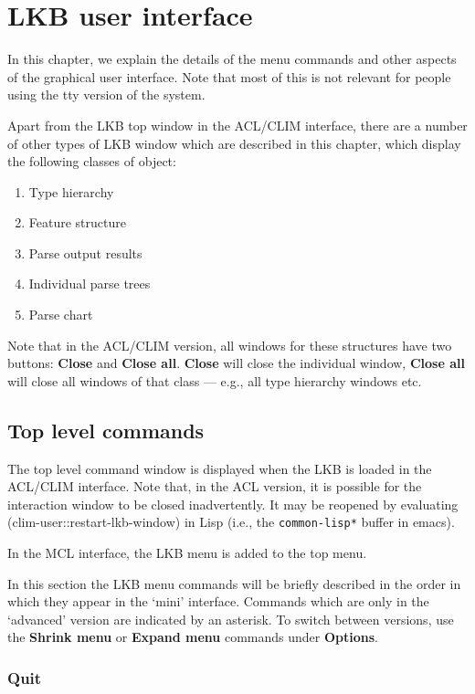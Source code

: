 \documentclass[12pt]{report}
\begin{document}
\chapter{LKB user interface}

In this chapter, we explain the details of the menu commands
and other aspects of the graphical user interface.
Note that most of this is not relevant for people using the tty version
of the system.

Apart from the LKB top window in the ACL/CLIM interface, there are
a number of other types of LKB window which are described in this chapter,
which display the following classes of object:
\begin{enumerate}
\item Type hierarchy
\item Feature structure 
\item Parse output results
\item Individual parse trees
\item Parse chart
\end{enumerate}
Note that in the ACL/CLIM version, all windows for these structures
have two buttons: {\bf Close} and {\bf Close all}.
{\bf Close} will close the individual window, {\bf Close all}
will close all windows of that class --- e.g., all type hierarchy windows
etc.

\section{Top level commands}

The top level command window is displayed when the LKB is loaded
in the ACL/CLIM interface.
Note that, in the ACL version, it is possible for the interaction
window to be closed inadvertently.
It may be reopened by evaluating
(clim-user::restart-lkb-window) in Lisp (i.e., the
{\tt *common-lisp*} buffer in emacs).

In the MCL interface, the LKB menu is added to the top menu.

In this section the LKB menu
commands will be briefly described in the order in
which they appear in the `mini' interface.
Commands which are only in the `advanced' version are indicated by
an asterisk.  To switch between versions, use the {\bf Shrink menu}
or {\bf Expand menu} commands under {\bf Options}.

\subsection{Quit}
\end{document}
